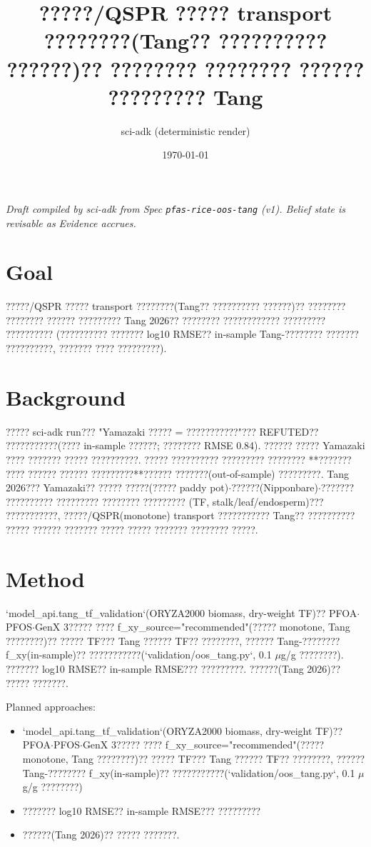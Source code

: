 \documentclass{article}
\title{?????/QSPR ????? transport ????????(Tang?? ?????????? ??????)?? ???????? ???????? ?????? ????????? Tang}
\author{sci-adk (deterministic render)}
\date{\today}
\begin{document}
\maketitle

\noindent\textit{Draft compiled by sci-adk from Spec \texttt{pfas-rice-oos-tang} (v1). Belief state is revisable as Evidence accrues.}

\section{Goal}
?????/QSPR ????? transport ????????(Tang?? ?????????? ??????)?? ???????? ???????? ?????? ????????? Tang
2026?? ???????? ???????????? ????????? ?????????? (?????????? ??????? log10 RMSE?? in-sample Tang-????????
??????? ??????????, ??????? ???? ?????????).

\section{Background}
????? sci-adk run??? "Yamazaki ????? = ???????????"??? REFUTED?? ???????????(???? in-sample ??????;
???????? RMSE 0.84). ?????? ????? Yamazaki ???? ??????? ????? ??????????. ????? ?????????? ?????????
???????? **??????? ???? ?????? ?????? ?????????**?????? ???????(out-of-sample) ?????????. Tang 2026???
Yamazaki?? ????? ?????(????? paddy pot)$\cdot$??????(Nipponbare)$\cdot$??????? ?????????? ????????? ???????? ?????????
(TF, stalk/leaf/endosperm)??? ???????????, ?????/QSPR(monotone) transport ??????????? Tang??
?????????? ????? ?????? ??????? ????? ????? ??????? ???????? ?????.

\section{Method}
`model\_api.tang\_tf\_validation`(ORYZA2000 biomass, dry-weight TF)?? PFOA$\cdot$PFOS$\cdot$GenX 3?????
???? f\_xy\_source="recommended"(????? monotone, Tang ????????)?? ????? TF??? Tang ?????? TF?? ????????,
?????? Tang-???????? f\_xy(in-sample)?? ???????????(`validation/oos\_tang.py`, 0.1 $\mu$g/g ????????).
??????? log10 RMSE?? in-sample RMSE??? ?????????. ??????(Tang 2026)?? ????? ???????.

Planned approaches:
\begin{itemize}
  \item `model\_api.tang\_tf\_validation`(ORYZA2000 biomass, dry-weight TF)?? PFOA$\cdot$PFOS$\cdot$GenX 3?????
???? f\_xy\_source="recommended"(????? monotone, Tang ????????)?? ????? TF??? Tang ?????? TF?? ????????,
?????? Tang-???????? f\_xy(in-sample)?? ???????????(`validation/oos\_tang.py`, 0.1 $\mu$g/g ????????)
  \item ??????? log10 RMSE?? in-sample RMSE??? ?????????
  \item ??????(Tang 2026)?? ????? ???????.
\end{itemize}
\end{document}
